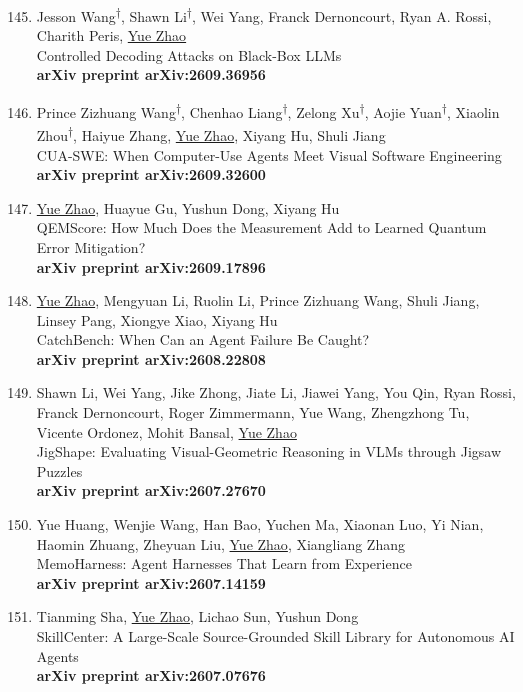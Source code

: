 \documentclass[margin,line,pifont,palatino,courier]{res}
\newcommand{\equalcontrib}{\textsuperscript{$\dagger$}}
\newenvironment{benumerate}[1]{
    \let\oldItem\item
    \def\item{\addtocounter{enumi}{-2}\oldItem}
    \begin{enumerate}[leftmargin=0.25in,label=\textcolor{uscred}{\arabic*.}]
    \setcounter{enumi}{#1}
    \addtocounter{enumi}{1}
}{
    \end{enumerate}
}
\begin{document}
\begin{resume}
\begin{benumerate}{144}
    \item
    Jesson Wang\equalcontrib, Shawn Li\equalcontrib, Wei Yang, Franck Dernoncourt, Ryan A. Rossi, Charith Peris, \underline{Yue Zhao}\\
    Controlled Decoding Attacks on Black-Box LLMs\\
    \textbf{arXiv preprint arXiv:2609.36956}

    \item
    Prince Zizhuang Wang\equalcontrib, Chenhao Liang\equalcontrib, Zelong Xu\equalcontrib, Aojie Yuan\equalcontrib, Xiaolin Zhou\equalcontrib, Haiyue Zhang, \underline{Yue Zhao}, Xiyang Hu, Shuli Jiang\\
    CUA-SWE: When Computer-Use Agents Meet Visual Software Engineering\\
    \textbf{arXiv preprint arXiv:2609.32600}

    \item
    \underline{Yue Zhao}, Huayue Gu, Yushun Dong, Xiyang Hu\\
    QEMScore: How Much Does the Measurement Add to Learned Quantum Error Mitigation?\\
    \textbf{arXiv preprint arXiv:2609.17896}

    \item
    \underline{Yue Zhao}, Mengyuan Li, Ruolin Li, Prince Zizhuang Wang, Shuli Jiang, Linsey Pang, Xiongye Xiao, Xiyang Hu\\
    CatchBench: When Can an Agent Failure Be Caught?\\
    \textbf{arXiv preprint arXiv:2608.22808}

    \item
    Shawn Li, Wei Yang, Jike Zhong, Jiate Li, Jiawei Yang, You Qin, Ryan Rossi, Franck Dernoncourt, Roger Zimmermann, Yue Wang, Zhengzhong Tu, Vicente Ordonez, Mohit Bansal, \underline{Yue Zhao}\\
    JigShape: Evaluating Visual-Geometric Reasoning in VLMs through Jigsaw Puzzles\\
    \textbf{arXiv preprint arXiv:2607.27670}

    \item
    Yue Huang, Wenjie Wang, Han Bao, Yuchen Ma, Xiaonan Luo, Yi Nian, Haomin Zhuang, Zheyuan Liu, \underline{Yue Zhao}, Xiangliang Zhang\\
    MemoHarness: Agent Harnesses That Learn from Experience\\
    \textbf{arXiv preprint arXiv:2607.14159}

    \item
    Tianming Sha, \underline{Yue Zhao}, Lichao Sun, Yushun Dong\\
    SkillCenter: A Large-Scale Source-Grounded Skill Library for Autonomous AI Agents\\
    \textbf{arXiv preprint arXiv:2607.07676}


\end{benumerate}
\end{resume}
\end{document}

